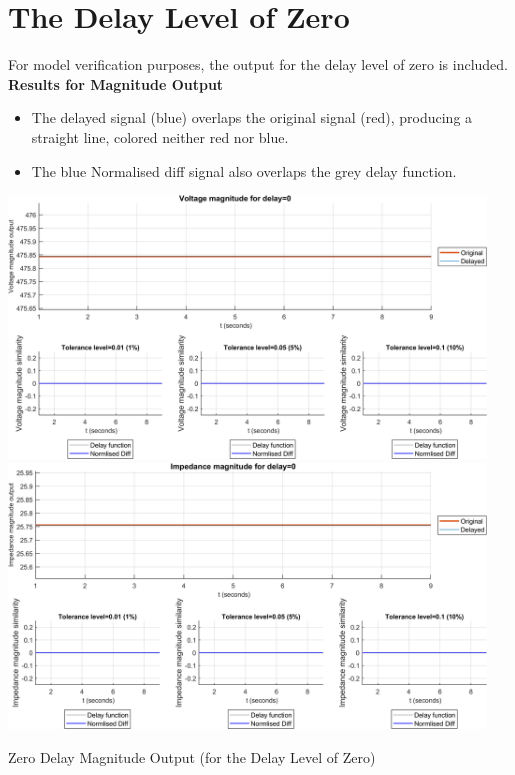\section{The Delay Level of Zero}
For model verification purposes, the output for the delay level of zero is included.
\newpage  \textbf{Results for Magnitude Output}

         \begin{itemize}
         \item      The delayed signal (blue) overlaps the original signal (red), producing a straight line, colored neither red nor blue.
         \item  The blue Normalised diff signal also overlaps the grey delay function.
          \end{itemize} 


\begin{floatingfigure}[p]{\textwidth}
    \includegraphics[width=0.95\textwidth]{PMUsim-figures/DelayOf_0/Zero_vMagnitude.png}    
    \label{fig:PMUsim_Zero_vMagnitude}
    \includegraphics[width=0.95\textwidth]{PMUsim-figures/DelayOf_0/Zero_iMagnitude.png}    
    \caption{Zero Delay Magnitude Output (for the Delay Level of Zero)}
    \label{fig:PMUsim_Zero_Magnitude}
\end{floatingfigure}

